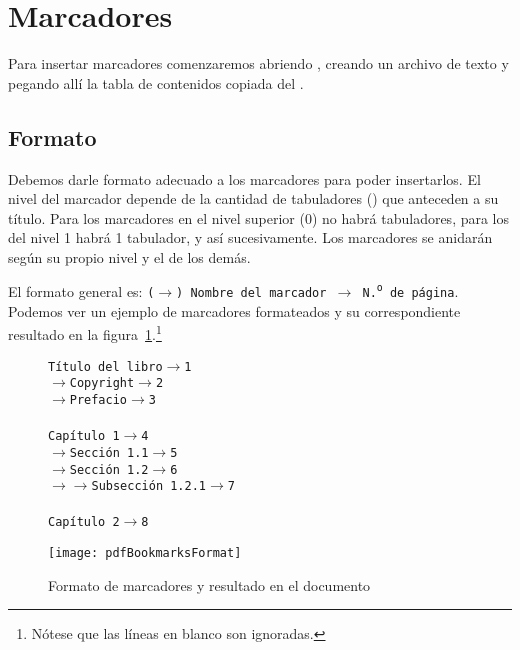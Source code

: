 \documentclass[%
	a5paper,
	10pt,
	twoside,
	openright,
	final,
]{memoir}
\begin{document}
{	\section{Marcadores\label{sec:pdfBookmarks}} Para insertar marcadores comenzaremos abriendo \notepad, creando un archivo de texto  y pegando allí la tabla de contenidos copiada del \pdf.

	\subsection{Formato} Debemos darle formato adecuado a los marcadores para poder insertarlos. El nivel del marcador depende de la cantidad de tabuladores (\keys{\tab}) que anteceden a su título. Para los marcadores en el nivel superior (0) no habrá tabuladores, para los del nivel 1 habrá 1 tabulador, y así sucesivamente. Los marcadores se anidarán según su propio nivel y el de los demás.

	El formato general es: \texttt{($\longrightarrow$) Nombre del marcador $\longrightarrow$ N.\textsuperscript{o} de página}. Podemos ver un ejemplo de marcadores formateados y su correspondiente resultado en la figura~\ref{fig:pdfBookmarksFormat}.\footnote{Nótese que las líneas en blanco son ignoradas.}

	\begin{figure}
		\footnotesize
		\begin{minipage}{.55\linewidth}
			\texttt{Título del libro$\longrightarrow$1\\
				$\longrightarrow$Copyright$\longrightarrow$2\\
				$\longrightarrow$Prefacio$\longrightarrow$3\\\\
				Capítulo 1$\longrightarrow$4\\
				$\longrightarrow$Sección 1.1$\longrightarrow$5\\
				$\longrightarrow$Sección 1.2$\longrightarrow$6\\
				$\longrightarrow\longrightarrow$Subsección 1.2.1$\longrightarrow$7\\\\
				Capítulo 2$\longrightarrow$8}
		\end{minipage}\hfill
		\begin{minipage}{.43\linewidth}
			\texttt{[image: pdfBookmarksFormat]}
		\end{minipage}%
		\caption{Formato de marcadores y resultado en el documento\label{fig:pdfBookmarksFormat}}
	\end{figure}

}
\end{document}
